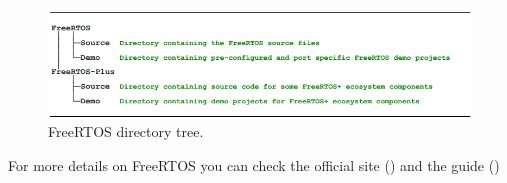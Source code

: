 \begin{figure}[H]
\vspace{0.4cm}
\includegraphics[width=\textwidth]{images/freeRTOS_folder.png}
\caption{FreeRTOS directory tree.}
\label{fig:freeRTOSFolder} %
\end{figure}

For more details on FreeRTOS you can check the official site (\cite{FreeRTOSPage}) and the guide (\cite{FreeRTOSGuide})









